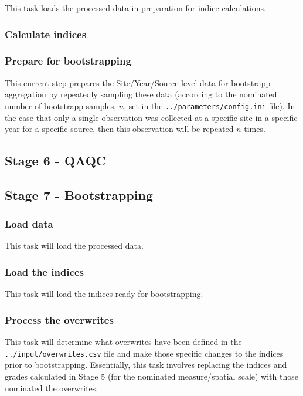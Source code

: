 \documentclass[
  8pt,
  a4paper]{article}
\begin{document}
This task loads the processed data in preparation for indice
calculations.

\subsubsection{Calculate indices}\label{calculate-indices}

\subsubsection{Prepare for
bootstrapping}\label{prepare-for-bootstrapping}

This current step prepares the Site/Year/Source level data for
bootstrapp aggregation by repeatedly sampling these data (according to
the nominated number of bootstrapp samples, \(n\), set in the
\texttt{../parameters/config.ini} file). In the case that only a single
observation was collected at a specific site in a specific year for a
specific source, then this observation will be repeated \(n\) times.

\subsection{Stage 6 - QAQC}\label{stage-6---qaqc}

\subsection{Stage 7 - Bootstrapping}\label{stage-7---bootstrapping}

\subsubsection{Load data}\label{load-data}

This task will load the processed data.

\subsubsection{Load the indices}\label{load-the-indices}

This task will load the indices ready for bootstrapping.

\subsubsection{Process the overwrites}\label{process-the-overwrites}

This task will determine what overwrites have been defined in the
\texttt{../input/overwrites.csv} file and make those specific changes to
the indices prior to bootstrapping. Essentially, this task involves
replacing the indices and grades calculated in Stage 5 (for the
nominated measure/spatial scale) with those nominated the overwrites.
\end{document}

